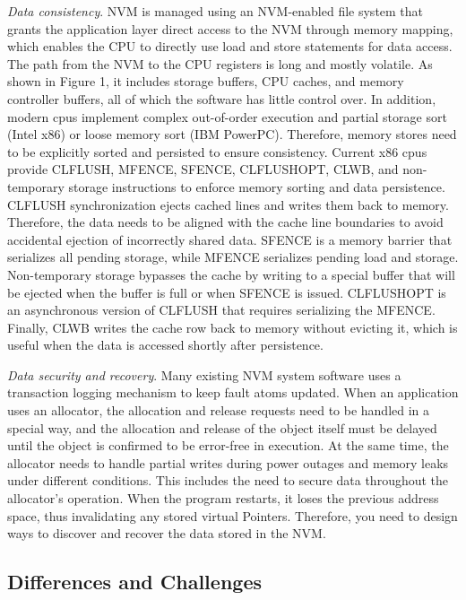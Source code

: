 \documentclass[sigconf]{acmart}
\begin{document}
\emph{Data consistency}. NVM is managed using an NVM-enabled file system that grants the application layer direct access to the NVM through memory mapping, which enables the CPU to directly use load and store statements for data access. The path from the NVM to the CPU registers is long and mostly volatile. As shown in Figure 1, it includes storage buffers, CPU caches, and memory controller buffers, all of which the software has little control over. In addition, modern cpus implement complex out-of-order execution and partial storage sort (Intel x86) or loose memory sort (IBM PowerPC). Therefore, memory stores need to be explicitly sorted and persisted to ensure consistency. Current x86 cpus provide CLFLUSH, MFENCE, SFENCE, CLFLUSHOPT, CLWB, and non-temporary storage instructions to enforce memory sorting and data persistence. CLFLUSH synchronization ejects cached lines and writes them back to memory. Therefore, the data needs to be aligned with the cache line boundaries to avoid accidental ejection of incorrectly shared data. SFENCE is a memory barrier that serializes all pending storage, while MFENCE serializes pending load and storage. Non-temporary storage bypasses the cache by writing to a special buffer that will be ejected when the buffer is full or when SFENCE is issued. CLFLUSHOPT is an asynchronous version of CLFLUSH that requires serializing the MFENCE. Finally, CLWB writes the cache row back to memory without evicting it, which is useful when the data is accessed shortly after persistence.

\emph{Data security and recovery}. Many existing NVM system software uses a transaction logging mechanism to keep fault atoms updated. When an application uses an allocator, the allocation and release requests need to be handled in a special way, and the allocation and release of the object itself must be delayed until the object is confirmed to be error-free in execution. At the same time, the allocator needs to handle partial writes during power outages and memory leaks under different conditions. This includes the need to secure data throughout the allocator's operation. When the program restarts, it loses the previous address space, thus invalidating any stored virtual Pointers. Therefore, you need to design ways to discover and recover the data stored in the NVM.


\subsection{Differences and Challenges}
\end{document}
